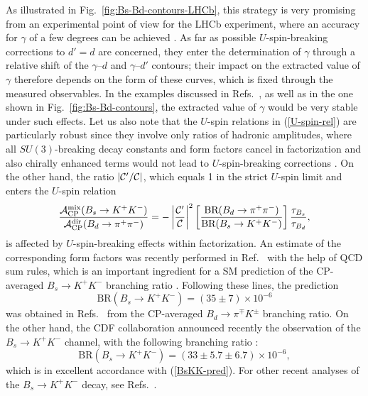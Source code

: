 \documentclass[12pt]{article}
\begin{document}
As illustrated in Fig.~\ref{fig:Bs-Bd-contours-LHCb},
this strategy is very promising from an experimental point of view
for the LHCb experiment, where an accuracy for $\gamma$ of a few degrees
can be achieved \cite{LHC-Book,schneider,LHCb-analyses}. As far as 
possible $U$-spin-breaking 
corrections to $d'=d$ are concerned, they enter the determination of $\gamma$ 
through a relative shift of the $\gamma$--$d$ and $\gamma$--$d'$ contours; 
their impact on the extracted value of $\gamma$ therefore depends on the form 
of these curves, which is fixed through the measured observables. In the examples discussed in Refs.~\cite{RF-Phys-Rep,RF-BsKK}, as well as in the one
 shown in 
Fig.~\ref{fig:Bs-Bd-contours}, the extracted value of $\gamma$ would be very 
stable under such effects. Let us also note that the $U$-spin
relations in (\ref{U-spin-rel}) are particularly robust since they involve only
ratios of hadronic amplitudes, where all $SU(3)$-breaking decay constants
and form factors cancel in factorization and also chirally enhanced terms
would not lead to  $U$-spin-breaking corrections \cite{RF-BsKK}. 
On the other hand, the ratio $|{\cal C}'/{\cal C}|$, which equals 1 in the strict 
$U$-spin limit and enters the $U$-spin relation
\begin{equation}
\frac{{\cal A}_{\rm CP}^{\rm mix}
(B_s\to K^+K^-)}{{\cal A}_{\rm CP}^{\rm dir}(B_d\to\pi^+\pi^-)}=
-\left|\frac{{\cal C}'}{{\cal C}}\right|^2
\left[\frac{\mbox{BR}(B_d\to\pi^+\pi^-)}{\mbox{BR}(B_s\to K^+K^-)}\right]
\frac{\tau_{B_s}}{\tau_{B_d}},
\end{equation}
is affected by $U$-spin-breaking effects within factorization. An 
estimate of the corresponding form factors was recently performed
in Ref.~\cite{KMM} with the help of QCD sum rules, which is an important 
ingredient for a SM prediction of the CP-averaged $B_s\to K^+K^-$ branching 
ratio \cite{BFRS3}. Following these lines, the prediction
\begin{equation}\label{BsKK-pred}
\mbox{BR}(B_s\to K^+K^-)=(35\pm7)\times 10^{-6}
\end{equation}
was obtained in Refs.~\cite{BFRS3,BFRS-up} from the CP-averaged 
$B_d\to\pi^\mp K^\pm$ branching ratio. On the other hand, the CDF collaboration 
announced recently the observation of the $B_s\to K^+K^-$ channel, with the following 
branching ratio \cite{CDF-BsKK}:
\begin{equation}%
\mbox{BR}(B_s\to K^+K^-)=(33\pm5.7\pm6.7)\times 10^{-6},
\end{equation}
which is in excellent accordance  with (\ref{BsKK-pred}).
For other recent analyses of the $B_s\to K^+K^-$ decay, see Refs.~\cite{safir,BLMV}.
\end{document}
